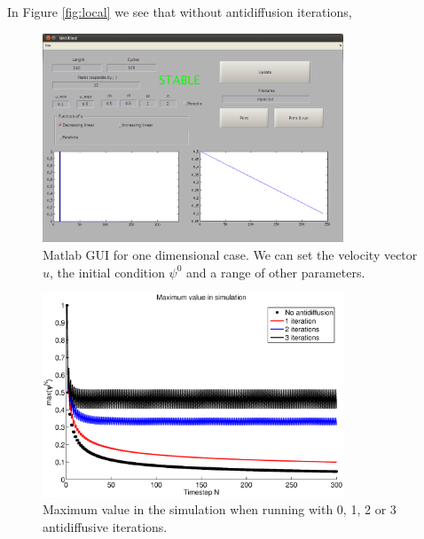 \documentclass[10pt, a4paper]{article}
\begin{document}
In Figure \ref{fig:local} we see that without antidiffusion iterations,

\begin{figure}
\centering
 \includegraphics[width=0.8\textwidth]{1dscreenshot.png}
 \caption{Matlab GUI for one dimensional case. We can set the velocity vector $u$, the initial condition $\psi^0$ and a range of other parameters.}
 \label{fig:1dgui}
\end{figure}

\begin{figure}
\centering
 \includegraphics[width=0.8\textwidth]{maxs}
 \caption{Maximum value in the simulation when running with 0, 1, 2 or 3 antidiffusive iterations.}
 \label{fig:maxs}
\end{figure}
\end{document}
